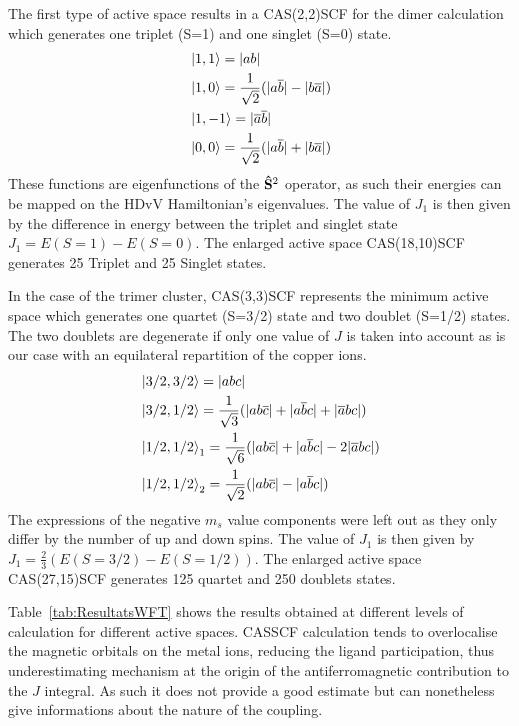 \documentclass[12pt,a4paper]{report}
\numberwithin{equation}{section}
\begin{document}
\noindent The first type of active space results in a CAS(2,2)SCF for the dimer calculation which generates one triplet (S=1) and one singlet (S=0) state.
\begin{align}
    \begin{split}
    &\ket{1,1}=|ab|\\
    &\ket{1,0}=\frac{1}{\sqrt{2}}(|a\overline{b}|-|b\overline{a}|)\\
    &\ket{1,-1}=|\overline{a}\overline{b}|\\
    &\ket{0,0}=\frac{1}{\sqrt{2}}(|a\overline{b}|+|b\overline{a}|)
    \end{split}
\end{align}
These functions are eigenfunctions of the $\vb{\hat{S}}^2$ operator, as such their energies can be mapped on the HDvV Hamiltonian's eigenvalues.
The value of $J_1$ is then given by the difference in energy between the triplet and singlet state $J_1=E(S=1)-E(S=0)$.
The enlarged active space CAS(18,10)SCF generates 25 Triplet and 25 Singlet states.

In the case of the trimer cluster, CAS(3,3)SCF represents the minimum active space which generates one quartet (S=3/2) state and two doublet (S=1/2) states.
The two doublets are degenerate if only one value of $J$ is taken into account as is our case with an equilateral repartition of the copper ions.
\begin{align}
    \begin{split}
    &\ket{3/2,3/2}=|abc|\\
    &\ket{3/2,1/2}=\frac{1}{\sqrt{3}}(|ab\overline{c}|+|a\overline{b}c|+|\overline{a}bc|)\\
    &\ket{1/2,1/2}_1=\frac{1}{\sqrt{6}}(|ab\overline{c}|+|a\overline{b}c|-2|\overline{a}bc|)\\
    &\ket{1/2,1/2}_2=\frac{1}{\sqrt{2}}(|ab\overline{c}|-|a\overline{b}c|)
    \end{split}
\end{align}
The expressions of the negative $m_s$ value components were left out as they only differ by the number of up and down spins.
The value of $J_1$ is then given by $J_1=\frac{2}{3}(E(S=3/2)-E(S=1/2))$.
The enlarged active space CAS(27,15)SCF generates 125 quartet and 250 doublets states.

Table~\ref{tab:ResultatsWFT} shows the results obtained at different levels of calculation for different active spaces.
CASSCF calculation tends to overlocalise the magnetic orbitals on the metal ions, reducing the ligand participation, thus underestimating mechanism at the origin of the antiferromagnetic contribution to the $J$ integral.
As such it does not provide a good estimate but can nonetheless give informations about the nature of the coupling.
\end{document}
